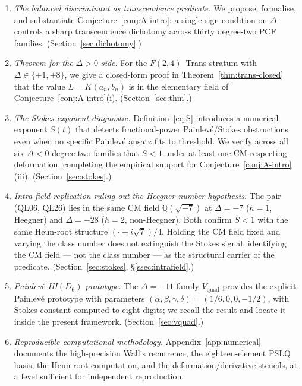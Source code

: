 \documentclass[11pt,reqno]{amsart}
\theoremstyle{definition}
\begin{document}
\begin{enumerate}[label={\bfseries(C\arabic*)}]
\item \emph{The balanced discriminant as transcendence
predicate.} We propose, formalise, and substantiate
Conjecture~\ref{conj:A-intro}: a single sign condition on
$\Delta$ controls a sharp transcendence dichotomy across
thirty degree-two PCF families. (Section~\ref{sec:dichotomy}.)

\item \emph{Theorem for the $\Delta>0$ side.} For the
$F(2,4)$~Trans stratum with
$\Delta\in\{+1,+8\}$, we give a closed-form proof in
Theorem~\ref{thm:trans-closed} that the value
$L = K(a_{n},b_{n})$ is in the elementary field of
Conjecture~\ref{conj:A-intro}(i). (Section~\ref{sec:thm}.)

\item \emph{The Stokes-exponent diagnostic.}
Definition~\eqref{eq:S} introduces a numerical exponent
$S(t)$ that detects fractional-power Painlev\'e/Stokes
obstructions even when no specific Painlev\'e ansatz fits
to threshold. We verify across all six $\Delta<0$
degree-two families that $S<1$ under at least one
CM-respecting deformation, completing the empirical
support for Conjecture~\ref{conj:A-intro}(iii).
(Section~\ref{sec:stokes}.)

\item \emph{Intra-field replication ruling out the
Heegner-number hypothesis.} The pair (QL06, QL26) lies in
the same CM field $\mathbb{Q}(\sqrt{-7})$ at $\Delta=-7$
($h=1$, Heegner) and $\Delta=-28$ ($h=2$, non-Heegner).
Both confirm $S<1$ with the same Heun-root structure
$(\cdot \pm i\sqrt{7})/4$. Holding the CM field fixed and
varying the class number does not extinguish the Stokes
signal, identifying the CM field --- not the class number ---
as the structural carrier of the predicate.
(Section~\ref{sec:stokes}, \S\ref{ssec:intrafield}.)

\item \emph{Painlev\'e III$(D_{6})$ prototype.} The
$\Delta=-11$ family $V_{\mathrm{quad}}$ provides the explicit
Painlev\'e prototype with parameters
$(\alpha,\beta,\gamma,\delta) = (1/6, 0, 0, -1/2)$, with
Stokes constant computed to eight digits; we recall the
result and locate it inside the present framework.
(Section~\ref{sec:vquad}.)

\item \emph{Reproducible computational methodology.}
Appendix~\ref{app:numerical} documents the high-precision
Wallis recurrence, the eighteen-element PSLQ basis, the
Heun-root computation, and the deformation/derivative
stencils, at a level sufficient for independent
reproduction.
\end{enumerate}
\end{document}
